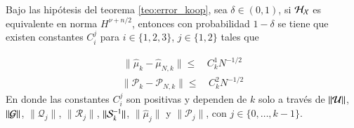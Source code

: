 \begin{teo}
    Bajo las hipótesis del teorema \ref{teo:error_koop}, sea $\delta \in (0, 1)$, si $\H_\X$ es equivalente en norma $H^{\nu + n/2}$, entonces con probabilidad $1-\delta$ se tiene que existen constantes $C_i^j$ para $i \in \{1, 2, 3\}$, $j \in \{1, 2\}$ tales que
	
	\begin{equation*}
		\begin{aligned}
			\| \hat \mu_{k} - \hat \mu_{N,k}  \| \leq & \, C_{k}^1 N^{-1/2}
		\end{aligned}
	\end{equation*}
	\begin{equation*}
		\begin{aligned}
			\| \mathcal{P}_{k} - \mathcal{P}_{N,k}  \| \leq & \, C_{k}^2 N^{-1/2} 
		\end{aligned}
	\end{equation*}
	En donde las constantes $C_i^j$ son positivas y dependen de $k$ solo a través de $\| \U \| $, $\| \G \| $, $\| \mathcal{Q}_{j} \| $, $\| \mathcal{R}_{j} \| $, $\| \S_{k}^{-1} \| $, $\| \hat{\mu}_{j} \| $ y $\| \mathcal{P}_{j} \| $, con $j \in \{ 0, \dots, k-1\}$.
    \label{teo:teo_kerKKF_2}
\end{teo}

